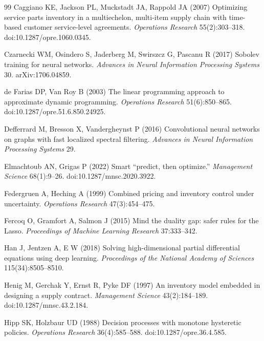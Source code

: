 \documentclass[11pt,letterpaper]{article}
\theoremstyle{definition}
\newcommand{\1}{\mathbf 1}
\begin{document}
\begin{thebibliography}{99}
Caggiano KE, Jackson PL, Muckstadt JA, Rappold JA (2007) Optimizing service parts inventory in a multiechelon, multi-item supply chain with time-based customer service-level agreements. \emph{Operations Research} 55(2):303--318. doi:10.1287/opre.1060.0345.

Czarnecki WM, Osindero S, Jaderberg M, Swirszcz G, Pascanu R (2017) Sobolev training for neural networks. \emph{Advances in Neural Information Processing Systems} 30. arXiv:1706.04859.

de Farias DP, Van Roy B (2003) The linear programming approach to approximate dynamic programming. \emph{Operations Research} 51(6):850--865. doi:10.1287/opre.51.6.850.24925.

Defferrard M, Bresson X, Vandergheynst P (2016) Convolutional neural networks on graphs with fast localized spectral filtering. \emph{Advances in Neural Information Processing Systems} 29.

Elmachtoub AN, Grigas P (2022) Smart ``predict, then optimize.'' \emph{Management Science} 68(1):9--26. doi:10.1287/mnsc.2020.3922.

Federgruen A, Heching A (1999) Combined pricing and inventory control under uncertainty. \emph{Operations Research} 47(3):454--475.

Fercoq O, Gramfort A, Salmon J (2015) Mind the duality gap: safer rules for the Lasso. \emph{Proceedings of Machine Learning Research} 37:333--342.

Han J, Jentzen A, E W (2018) Solving high-dimensional partial differential equations using deep learning. \emph{Proceedings of the National Academy of Sciences} 115(34):8505--8510.

Henig M, Gerchak Y, Ernst R, Pyke DF (1997) An inventory model embedded in designing a supply contract. \emph{Management Science} 43(2):184--189. doi:10.1287/mnsc.43.2.184.

Hipp SK, Holzbaur UD (1988) Decision processes with monotone hysteretic policies. \emph{Operations Research} 36(4):585--588. doi:10.1287/opre.36.4.585.


\end{thebibliography}
\end{document}
